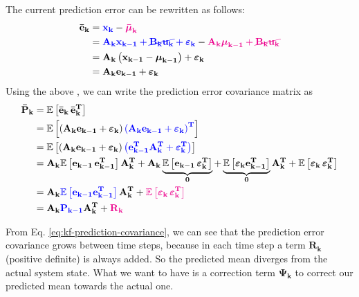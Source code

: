 \documentclass[12pt]{article}
\newcommand{\bvec}[1]{\mathbf{#1}} %
\newcommand{\bvecT}[1]{\mathbf{#1^T}} %
\newcommand{\mat}[1]{\mathbf{#1}}
\newcommand{\matT}[1]{\mathbf{#1^T}}
\newcommand{\brac}[1]{\left[#1\right]} %
\newcommand{\parentheses}[1]{\left(#1\right)}
\newcommand{\mb}[1]{{\boldsymbol{#1}}} %
\newcommand{\expv}[1]{\mathbb{E}\brac{#1}} %
\newcommand{\eps}{\varepsilon}
\newcommand{\blue}[1]{\color{blue}#1\color{black}}
\newcommand{\magenta}[1]{\color{magenta}#1\color{black}}
\begin{document}
The current prediction error can be rewritten as follows:
\begin{equation}
    \begin{aligned}
        \bvec{\bar{e}_k} &= \blue{\bvec{x_k}} - \magenta{\mb{\bar{\mu}}_\mathbf{k}} \\
        &= \blue{\mat{A_k}\bvec{x_{k-1}} + \cancel{\mat{B_k}\bvec{u_k}} + \mb{\eps}_\mathbf{k}} - \magenta{\mat{A_k} \mb{\mu}_\mathbf{k-1} + \cancel{\mat{B_k}\bvec{u_k}} }\\
        &= \mat{A_k}\parentheses{\bvec{x_{k-1}} - \mb{\mu}_\mathbf{k-1}} + \mb{\eps}_\mathbf{k} \\
        &= \mat{A_k}\bvec{e_{k-1}} + \mb{\eps}_\mathbf{k}
    \end{aligned}
\end{equation}
Using the above , we can write the prediction error covariance matrix as
\begin{equation}
    \begin{aligned}
        \mat{\bar{P}_k} &= \expv{\bvec{\bar{e}_k} \, \bvecT{\bar{e}_k}}\\
        &= \expv{\parentheses{\mat{A_k}\bvec{e_{k-1}} + \mb{\varepsilon}_\mathbf{k}} \blue{\parentheses{\mat{A_k}\bvec{e_{k-1}} + \mb{\varepsilon}_\mathbf{k}}^\mathbf{T}}}\\
        &= \expv{\parentheses{\mat{A_k}\bvec{e_{k-1}} + \mb{\varepsilon}_\mathbf{k}} \blue{\parentheses{\bvecT{e_{k-1}}\matT{A_k} + \mb{\varepsilon}_\mathbf{k}^\mathbf{T}}}}\\
        &= \mat{A_k}\expv{\mathbf{e_{k-1}\,e_{k-1}^T}}\matT{A_k} + \mat{A_k}\underbrace{\expv{\bvec{e_{k-1}}\,\mb{\eps}_\mathbf{k}^\mathbf{T}}}_{\mat{0}}+ \underbrace{\expv{\mb{\varepsilon}_\mathbf{k}\bvecT{e_{k-1}}}}_{\mat{0}}\matT{A_k} + \expv{\mb{\varepsilon}_\mathbf{k}\,\mb{\varepsilon}_\mathbf{k}^\mathbf{T}}\\
        &= \mat{A_k} \blue{\expv{\bvec{e_{k-1}} \bvecT{e_{k-1}}}} \matT{A_k} + \magenta{\expv{\mb{\varepsilon}_\mathbf{k}\,\mb{\varepsilon}_\mathbf{k}^\mathbf{T}}}\\
        &= \mat{A_k} \blue{\mat{P_{k-1}}} \matT{A_k} + \magenta{\mat{R_k}}
    \end{aligned}
    \label{eq:kf-prediction-covariance}
\end{equation}

From Eq. \ref{eq:kf-prediction-covariance}, we can see that the prediction error covariance grows between time steps, because in each time step a term $\mat{R_k}$ (positive definite) is always added. So the predicted mean diverges from the actual system state. What we want to have is a correction term $\mat{\Psi_k}$ to correct our predicted mean towards the actual one.
\end{document}
